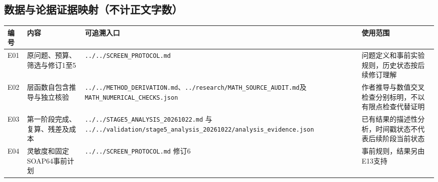\documentclass[11pt,a4paper]{article}
\newcounter{none}
\begin{document}
\subsection{数据与论据证据映射（不计正文字数）}\label{ux6570ux636eux4e0eux8bbaux636eux8bc1ux636eux6620ux5c04ux4e0dux8ba1ux6b63ux6587ux5b57ux6570}

{\def\LTcaptype{none} %
\begin{longtable}[]{@{}
  >{\raggedright\arraybackslash}p{}
  >{\raggedright\arraybackslash}p{}
  >{\raggedright\arraybackslash}p{}
  >{\raggedright\arraybackslash}p{}@{}}
\toprule\noalign{}
\begin{minipage}[b]{\linewidth}\raggedright
编号
\end{minipage} & \begin{minipage}[b]{\linewidth}\raggedright
内容
\end{minipage} & \begin{minipage}[b]{\linewidth}\raggedright
可追溯入口
\end{minipage} & \begin{minipage}[b]{\linewidth}\raggedright
使用范围
\end{minipage} \\
\midrule\noalign{}
\endhead
\bottomrule\noalign{}
\endlastfoot
E01 & 原问题、预算、筛选与修订1至5 & \texttt{../\allowbreak{}../\allowbreak{}SCREEN\_\allowbreak{}PROTOCOL.md} & 问题定义和事前实验规则，历史状态按后续修订理解 \\
E02 & 层函数自包含推导与独立核验 & \texttt{../\allowbreak{}../\allowbreak{}METHOD\_\allowbreak{}DERIVATION.md}、\texttt{../\allowbreak{}research/\allowbreak{}MATH\_\allowbreak{}SOURCE\_\allowbreak{}AUDIT.md}及\texttt{MATH\_\allowbreak{}NUMERICAL\_\allowbreak{}CHECKS.json} & 作者推导与数值交叉检查分别标明，不以有限点检查代替证明 \\
E03 & 第一阶段完成、复算、残差及成本 & \texttt{../\allowbreak{}../\allowbreak{}STAGE5\_\allowbreak{}ANALYSIS\_\allowbreak{}20261022.md} 与 \texttt{../\allowbreak{}../\allowbreak{}validation/\allowbreak{}stage5\_\allowbreak{}analysis\_\allowbreak{}20261022/\allowbreak{}analysis\_\allowbreak{}evidence.json} & 已有结果的描述性分析，时间戳状态不代表后续阶段当前状态 \\
E04 & 灵敏度和固定SOAP64事前计划 & \texttt{../\allowbreak{}../\allowbreak{}SCREEN\_\allowbreak{}PROTOCOL.md} 修订6 & 事前规则，结果另由E13支持 \\

\end{longtable}}
\end{document}
